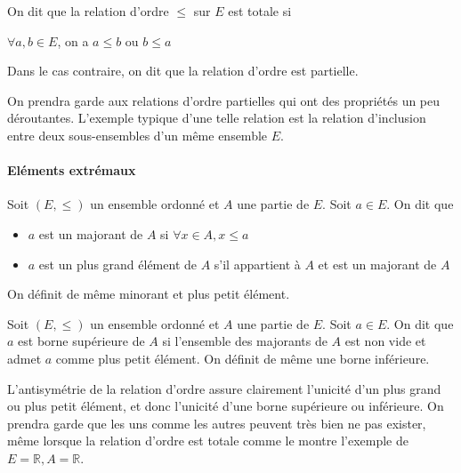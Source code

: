 \begin{de}
On dit que la relation d'ordre $\leqslant$ sur $E$ est totale si

$\forall a,b \in E$, on a $a \leqslant b$ ou $b \leqslant a$

Dans le cas contraire, on dit que la relation d'ordre est partielle.
\end{de}

\begin{rem}
On prendra garde aux relations d'ordre partielles qui ont
des propriétés un peu déroutantes. L'exemple typique d'une telle
relation est la relation d'inclusion entre deux sous-ensembles d'un même
ensemble $E$.
\end{rem}

\paragraph{Eléments extrémaux}

\begin{de}
Soit $(E,\leqslant)$ un ensemble ordonné et $A$ une partie de $E$.
Soit $a \in E$. On dit que

\begin{itemize}
\itemsep1pt\parskip0pt
\item
  $a$ est un majorant de $A$ si $\forall x \in A, x \leqslant a$
\item
  $a$ est un plus grand élément de $A$ s'il appartient à $A$ et est un
  majorant de $A$
\end{itemize}

On définit de même minorant et plus petit élément.
\end{de}

\begin{de}
Soit $(E,\leqslant)$ un ensemble ordonné et $A$ une partie de $E$.
Soit $a \in E$. On dit que $a$ est borne supérieure de $A$ si l'ensemble des
majorants de $A$ est non vide et admet $a$ comme plus petit élément. On
définit de même une borne inférieure.
\end{de}

\begin{rem}
L'antisymétrie de la relation d'ordre assure clairement
l'unicité d'un plus grand ou plus petit élément, et donc l'unicité d'une
borne supérieure ou inférieure. On prendra garde que les uns comme les
autres peuvent très bien ne pas exister, même lorsque la relation
d'ordre est totale comme le montre l'exemple de $E = \mathbb{R}, A = \mathbb{R}$.
\end{rem}


